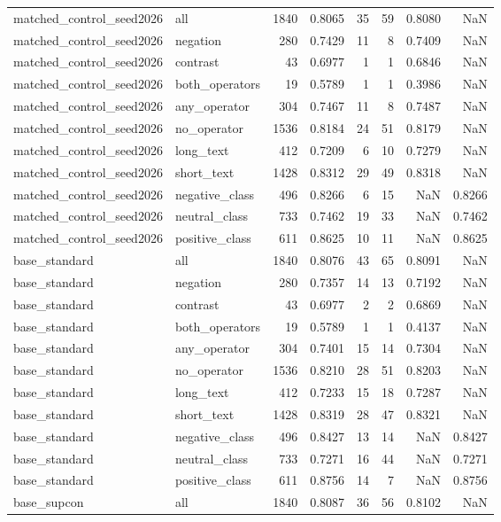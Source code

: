 \begin{tabular}{llrrrrrr}
matched\_control\_seed2026 & all & 1840 & 0.8065 & 35 & 59 & 0.8080 & NaN \\
matched\_control\_seed2026 & negation & 280 & 0.7429 & 11 & 8 & 0.7409 & NaN \\
matched\_control\_seed2026 & contrast & 43 & 0.6977 & 1 & 1 & 0.6846 & NaN \\
matched\_control\_seed2026 & both\_operators & 19 & 0.5789 & 1 & 1 & 0.3986 & NaN \\
matched\_control\_seed2026 & any\_operator & 304 & 0.7467 & 11 & 8 & 0.7487 & NaN \\
matched\_control\_seed2026 & no\_operator & 1536 & 0.8184 & 24 & 51 & 0.8179 & NaN \\
matched\_control\_seed2026 & long\_text & 412 & 0.7209 & 6 & 10 & 0.7279 & NaN \\
matched\_control\_seed2026 & short\_text & 1428 & 0.8312 & 29 & 49 & 0.8318 & NaN \\
matched\_control\_seed2026 & negative\_class & 496 & 0.8266 & 6 & 15 & NaN & 0.8266 \\
matched\_control\_seed2026 & neutral\_class & 733 & 0.7462 & 19 & 33 & NaN & 0.7462 \\
matched\_control\_seed2026 & positive\_class & 611 & 0.8625 & 10 & 11 & NaN & 0.8625 \\
base\_standard & all & 1840 & 0.8076 & 43 & 65 & 0.8091 & NaN \\
base\_standard & negation & 280 & 0.7357 & 14 & 13 & 0.7192 & NaN \\
base\_standard & contrast & 43 & 0.6977 & 2 & 2 & 0.6869 & NaN \\
base\_standard & both\_operators & 19 & 0.5789 & 1 & 1 & 0.4137 & NaN \\
base\_standard & any\_operator & 304 & 0.7401 & 15 & 14 & 0.7304 & NaN \\
base\_standard & no\_operator & 1536 & 0.8210 & 28 & 51 & 0.8203 & NaN \\
base\_standard & long\_text & 412 & 0.7233 & 15 & 18 & 0.7287 & NaN \\
base\_standard & short\_text & 1428 & 0.8319 & 28 & 47 & 0.8321 & NaN \\
base\_standard & negative\_class & 496 & 0.8427 & 13 & 14 & NaN & 0.8427 \\
base\_standard & neutral\_class & 733 & 0.7271 & 16 & 44 & NaN & 0.7271 \\
base\_standard & positive\_class & 611 & 0.8756 & 14 & 7 & NaN & 0.8756 \\
base\_supcon & all & 1840 & 0.8087 & 36 & 56 & 0.8102 & NaN \\

\end{tabular}
